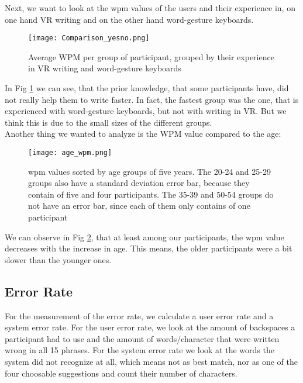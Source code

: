 Next, we want to look at the wpm values of the users and their experience in, on one hand VR writing and on the other hand word-gesture keyboards.\\

\begin{figure}[H]
    \centering
    \texttt{[image: Comparison\_yesno.png]}
    \caption{Average WPM per group of participant, grouped by their experience in VR writing and word-gesture keyboards}
    \label{fig:WPM_yesno}
\end{figure}

In Fig \ref{fig:WPM_yesno} we can see, that the prior knowledge, that some participants have, did not really help them to write faster. In fact, the fastest group was the one, that is experienced with word-gesture keyboards, but not with writing in VR. But we think this is due to the small sizes of the different groups.\\

Another thing we wanted to analyze is the WPM value compared to the age:
\begin{figure}[H]
    \centering
    \texttt{[image: age\_wpm.png]}
    \caption{wpm values sorted by age groups of five years. The 20-24 and 25-29 groups also have a standard deviation error bar, because they contain of five and four participants. The 35-39 and 50-54 groups do not have an error bar, since each of them only contains of one participant}
    \label{fig:WPM_age}
\end{figure}

We can observe in Fig \ref{fig:WPM_age}, that at least among our participants, the wpm value decreases with the increase in age. This means, the older participants were a bit slower than the younger ones. 

\subsection{Error Rate}
For the measurement of the error rate, we calculate a user error rate and a system error rate. For the user error rate, we look at the amount of backspaces a participant had to use and the amount of words/character that were written wrong in all 15 phrases. For the system error rate we look at the words the system did not recognize at all, which means not as best match, nor as one of the four choosable suggestions and count their number of characters.\\

